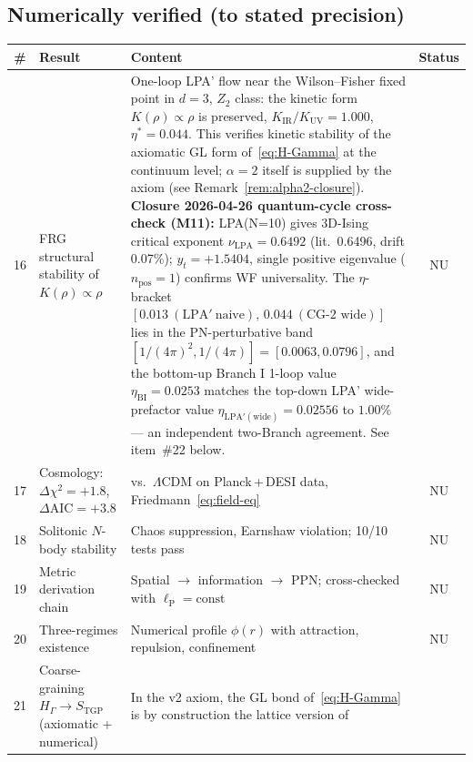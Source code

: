 \documentclass[11pt,a4paper]{article}
\newcommand{\lP}{\ell_{\mathrm{P}}}
\begin{document}
\subsection{Numerically verified (to stated precision)}

\begin{center}\small
\begin{longtable}{@{}clp{7.2cm}c@{}}
\toprule
\# & \textbf{Result} & \textbf{Content} & \textbf{Status}\\
\midrule
\endhead
16 & FRG structural stability of $K(\rho)\!\propto\!\rho$
  & One-loop LPA' flow near the Wilson--Fisher fixed point in $d=3$,
    $Z_{2}$ class: the kinetic form $K(\rho)\!\propto\!\rho$ is
    preserved, $K_{\mathrm{IR}}/K_{\mathrm{UV}}=1.000$, $\eta^{*}=0.044$.
    This verifies kinetic stability of the axiomatic GL form
    of~\eqref{eq:H-Gamma} at the continuum level; $\alpha=2$ itself
    is supplied by the axiom (see Remark~\ref{rem:alpha2-closure}).
    \textbf{Closure 2026-04-26 quantum-cycle cross-check (M11):}
    LPA(N=10) gives 3D-Ising critical exponent $\nu_{\mathrm{LPA}} = 0.6492$
    (lit.\ 0.6496, drift 0.07\%); $y_{t} = +1.5404$, single positive
    eigenvalue ($n_{\mathrm{pos}} = 1$) confirms WF universality.
    The $\eta$-bracket $[0.013\ (\mathrm{LPA}'\ \text{naive}),\,0.044\
    (\text{CG-2 wide})]$ lies in the PN-perturbative band
    $[1/(4\pi)^{2}, 1/(4\pi)] = [0.0063, 0.0796]$, and the bottom-up
    Branch I 1-loop value $\eta_{\mathrm{BI}} = 0.0253$ matches the
    top-down LPA' wide-prefactor value
    $\eta_{\mathrm{LPA}'(\mathrm{wide})} = 0.02556$ to $1.00\%$ ---
    an independent two-Branch agreement. See item~\#22 below.
  & \textsf{NU}\\
17 & Cosmology: $\Delta\chi^{2}=+1.8$, $\Delta\mathrm{AIC}=+3.8$
  & vs.\ $\Lambda$CDM on Planck\,+\,DESI data, Friedmann~\eqref{eq:field-eq}
  & \textsf{NU}\\
18 & Solitonic $N$-body stability
  & Chaos suppression, Earnshaw violation; 10/10 tests pass
  & \textsf{NU}\\
19 & Metric derivation chain
  & Spatial $\to$ information $\to$ PPN; cross-checked with $\lP=\mathrm{const}$
  & \textsf{NU}\\
20 & Three-regimes existence
  & Numerical profile $\phi(r)$ with attraction, repulsion, confinement
  & \textsf{NU}\\
21 & Coarse-graining $H_{\Gamma}\!\to\!S_{\mathrm{TGP}}$ (axiomatic + numerical)
  & In the v2 axiom, the GL bond of~\eqref{eq:H-Gamma} is by
    construction the lattice version of

\end{longtable}
\end{center}
\end{document}
